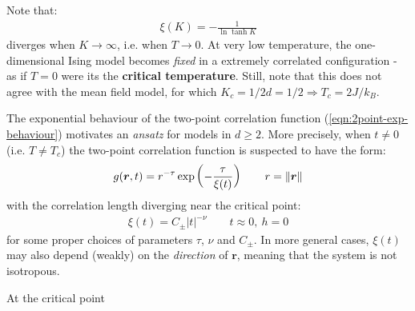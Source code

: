 \documentclass[../../main.tex]{subfiles}
\begin{document}
\medskip

Note that:
\begin{align*}
    \xi(K) = - \frac{1}{\ln \tanh K}  
\end{align*}
diverges when $K \to \infty$, i.e. when $T \to 0$. At very low temperature, the one-dimensional Ising model becomes \textit{fixed} in a extremely correlated configuration - as if $T=0$ were its the \textbf{critical temperature}. Still, note that this does not agree with the mean field model, for which $K_c = 1/2d = 1/2 \Rightarrow T_c = 2 J /k_B$. 

\medskip

The exponential behaviour of the two-point correlation function (\ref{eqn:2point-exp-behaviour}) motivates an \textit{ansatz} for models in $d \geq 2$. More precisely, when $t \neq 0$ (i.e. $T \neq T_c$) the two-point correlation function is suspected to have the form:
\begin{align*}
    g(\bm{r}, t) = r^{-\tau} \exp\left(-\frac{\tau}{\xi(t)} \right) \qquad r=\norm{\bm{r}}
\end{align*} 
with the correlation length diverging near the critical point:
\begin{align*}
    \xi(t) = C_\pm |t|^{-\nu} \qquad t \approx 0, \> h = 0
\end{align*}
for some proper choices of parameters $\tau$, $\nu$ and $C_\pm$. In more general cases, $\xi(t)$ may also depend (weakly) on the \textit{direction} of $\bm{r}$, meaning that the system is not isotropous.

\medskip

At the critical point %
\end{document}
